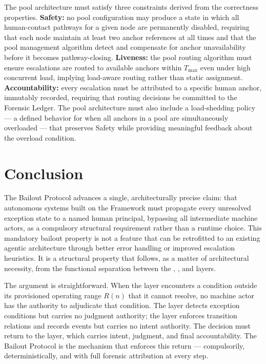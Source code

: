 The pool architecture must satisfy three constraints derived from the correctness properties. \textbf{Safety:} no pool configuration may produce a state in which all human-contact pathways for a given node are permanently disabled, requiring that each node maintain at least two anchor references at all times and that the pool management algorithm detect and compensate for anchor unavailability before it becomes pathway-closing. \textbf{Liveness:} the pool routing algorithm must ensure escalations are routed to available anchors within $T_{\max}$ even under high concurrent load, implying load-aware routing rather than static assignment. \textbf{Accountability:} every escalation must be attributed to a specific human anchor, immutably recorded, requiring that routing decisions be committed to the Forensic Ledger. The pool architecture must also include a load-shedding policy — a defined behavior for when all anchors in a pool are simultaneously overloaded — that preserves Safety while providing meaningful feedback about the overload condition.

\section{Conclusion}
\label{sec:conclusion}

The Bailout Protocol advances a single, architecturally precise claim: that autonomous systems built on the \bxthree{} Framework must propagate every unresolved exception state to a named human principal, bypassing all intermediate machine actors, as a compulsory structural requirement rather than a runtime choice. This mandatory bailout property is not a feature that can be retrofitted to an existing agentic architecture through better error handling or improved escalation heuristics. It is a structural property that follows, as a matter of architectural necessity, from the functional separation between the \purpose{}, \bounds{}, and \fact{} layers.

The argument is straightforward. When the \bounds{} layer encounters a condition outside its provisioned operating range $R(n)$ that it cannot resolve, no machine actor has the authority to adjudicate that condition. The \bounds{} layer detects exception conditions but carries no judgment authority; the \fact{} layer enforces transition relations and records events but carries no intent authority. The decision must return to the \purpose{} layer, which carries intent, judgment, and final accountability. The Bailout Protocol is the mechanism that enforces this return — compulsorily, deterministically, and with full forensic attribution at every step.

